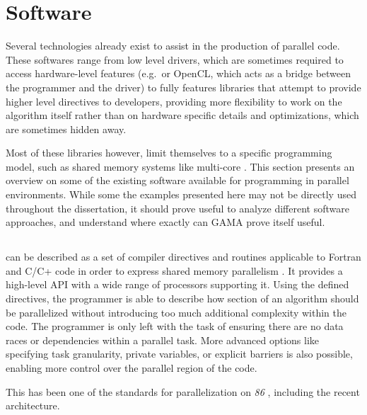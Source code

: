 \documentclass[main.tex]{subfiles}
\begin{document}
\section{Software}

Several technologies already exist to assist in the production of parallel code. These softwares range from low level drivers, which are sometimes required to access hardware-level features (e.g.\ \cuda or \acs{OpenCL}, which acts as a bridge between the programmer and the \gpu driver) to fully features libraries that attempt to provide higher level directives to developers, providing more flexibility to work on the algorithm itself rather than on hardware specific details and optimizations, which are sometimes hidden away.

Most of these libraries however, limit themselves to a specific programming model, such as shared memory systems like multi-core \cpus\xspace. This section presents an overview on some of the existing software available for programming in parallel environments. While some the examples presented here may not be directly used throughout the dissertation, it should prove useful to analyze different software approaches, and understand where exactly can \acs{GAMA} prove itself useful.


\subsection{\openmp}

\openmp can be described as a set of compiler directives and routines applicable to Fortran and C/C+ code in order to express shared memory parallelism \cite{dagum1998openmp}. It provides a high-level API with a wide range of processors supporting it.
Using the defined directives, the programmer is able to describe how section of an algorithm should be parallelized without introducing too much additional complexity within the code. The programmer is only left with the task of ensuring there are no data races or dependencies within a parallel task. More advanced options like specifying task granularity, private variables, or explicit barriers is also possible, enabling more control over the parallel region of the code.

This has been one of the standards for parallelization on \textit{86} \cpus, including the recent \intel \mic architecture.


\subsection{\cuda}
\end{document}
